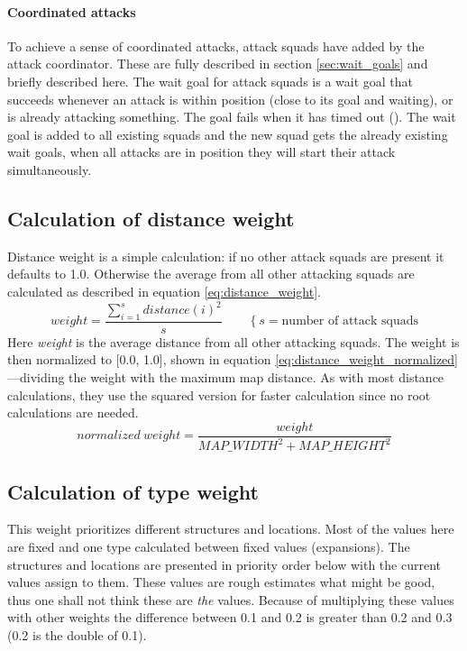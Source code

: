\paragraph{Coordinated attacks}
To achieve a sense of coordinated attacks, attack squads have  added by the attack coordinator. These are fully described in section \ref{sec:wait_goals} and briefly described here. The wait goal for attack squads is a wait goal that succeeds whenever an attack is within position (close to its goal and waiting), or is already attacking something. The goal fails when it has timed out (\attackCoordinatorWaitGoalTimeout). The wait goal is added to all existing squads and the new squad gets the already existing wait goals, when all attacks are in position they will start their attack simultaneously.

\subsection{Calculation of distance weight}
Distance weight is a simple calculation: if no other attack squads are present it defaults to 1.0. Otherwise the average from all other attacking squads are calculated as described in equation \ref{eq:distance_weight}.
\begin{equation}
\label{eq:distance_weight}
weight = \frac{\sum_{i=1}^{s}{distance(i)^2}}{s} \qquad \left\{s = \text{number of attack squads}\right.
\end{equation}
Here \emph{weight} is the average distance from all other attacking squads. The weight is then normalized to [0.0, 1.0], shown in equation \ref{eq:distance_weight_normalized}—dividing the weight with the maximum map distance. As with most distance calculations, they use the squared version for faster calculation since no root calculations are needed.
\begin{equation}
\label{eq:distance_weight_normalized}
normalized\ weight = \frac{weight}{MAP\_WIDTH^2 + MAP\_HEIGHT^2}
\end{equation}


\subsection{Calculation of type weight}
This weight prioritizes different structures and locations. Most of the values here are fixed and one type calculated between fixed values (expansions). The structures and locations are presented in priority order below with the current values assign to them. These values are rough estimates what might be good, thus one shall not think these are \emph{the} values. Because of multiplying these values with other weights the difference between 0.1 and 0.2 is greater than 0.2 and 0.3 (0.2 is the double of 0.1).

